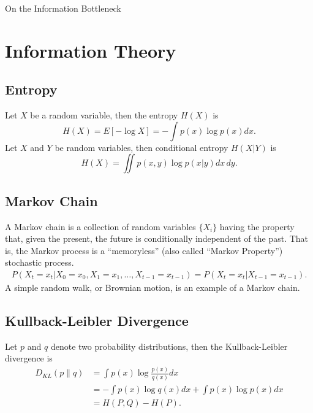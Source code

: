 \documentclass[11pt]{article}
\begin{document}
	
\begin{center}
{\LARGE On the Information Bottleneck} 
\end{center}

\begin{abstract}
The Information Bottleneck (IB) formalizes the notion of an information-theoretic ``optimal'' representation in terms of the fundamental tradeoff between having a concise representation and one with good predictive power. It was introduced by Naftali Tishby et al. in 1999 and appears to be fundamental to a deep understanding of representations. We draw connections to (1) minimal sufficient statistics, (2) the formulation of variational auto-encoders, and, (3) the topology of and SGD dynamics deep neural networks.
\end{abstract}

\section{Information Theory}

\subsection*{Entropy}
Let $X$ be a random variable, then the entropy $H(X)$ is
\begin{equation}
H(X) = E[-\log X] = -\int p(x) \log p(x) dx.
\end{equation}
Let $X$ and $Y$ be random variables, then conditional entropy $H(X\vert Y)$ is
\begin{equation}
H(X) = \iint p(x,y) \log p(x\vert y) dx\,dy.
\end{equation}

\subsection*{Markov Chain}
A Markov chain is a collection of random variables $\{X_i\}$ having the property that, given the present, the future is conditionally independent of the past. That is, the Markov process is a ``memoryless'' (also called ``Markov Property'') stochastic process.
\begin{align}
P(X_t = x_t \vert X_0 = x_0, X_1 = x_1, \ldots, X_{t-1}=x_{t-1}) = P(X_t=x_t \vert X_{t-1} = x_{t-1}).
\end{align}
A simple random walk, or Brownian motion, is an example of a Markov chain.

\subsection*{Kullback-Leibler Divergence}
Let $p$ and $q$ denote two probability distributions, then the Kullback-Leibler divergence is
\begin{align}
D_{KL}(p\rVert q)
&= \int p(x) \log \frac{p(x)}{q(x)} dx\\
&= - \int p(x) \log q(x) dx + \int p(x) \log p(x) dx \\
&= H(P, Q) - H(P).
\end{align}
\end{document}
